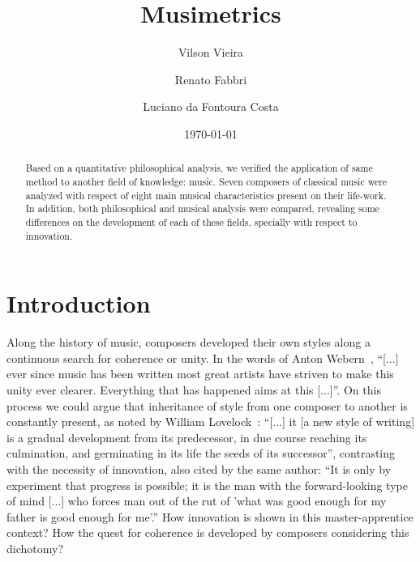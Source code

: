 \documentclass[
 aip,
 jmp,
 amsmath,amssymb,
 reprint,
]{revtex4-1}
\begin{document}

\title[Musimetrics]{Musimetrics}

\author{Vilson Vieira}%

\author{Renato Fabbri}%

\author{Luciano da Fontoura Costa}

\date{\today}

\begin{abstract}

Based on a quantitative philosophical analysis,
we verified the application of same method to another field of knowledge: music. Seven
composers of classical music were analyzed with respect of
eight main musical characteristics present on their life-work.
In addition, both philosophical and musical analysis
were compared, revealing some differences on the development of
each of these fields, specially with respect to innovation.

\end{abstract}


\maketitle

\section{\label{sec:level1}Introduction}

Along the history of music, composers developed their own styles along a
continuous search for coherence or unity. In the words of Anton
Webern~\cite{Webern}, ``[...] ever since music has been written most great artists
have striven to make this unity ever clearer. Everything that has
happened aims at this [...]''. On this process we could argue that
inheritance of style from one composer to another is constantly
present, as noted by William Lovelock~\cite{Lovelock}:
``[...] it [a new style of writing] is a gradual development from its
predecessor, in due course reaching its culmination, and germinating
in its life the seeds of its successor'', contrasting with the
necessity of innovation, also cited by the same author: 
``It is only by experiment that progress is possible; it is the man
with the forward-looking type of mind [...] who forces man out of the
rut of 'what was good enough for my father is good enough for me'.''
How innovation is shown in
this master-apprentice context? How the quest for coherence is
developed by composers considering this dichotomy?
\end{document}
